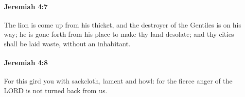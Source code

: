 		\paragraph{Jeremiah 4:7} %
			\label{JEREMIAH-4-7}

			The lion is come up from his thicket, and the destroyer of the Gentiles is on his way; he is gone forth from his place to make thy land desolate; and thy cities shall be laid waste, without an inhabitant.


		\paragraph{Jeremiah 4:8} %
			\label{JEREMIAH-4-8}

			For this gird you with sackcloth, lament and howl: for the fierce anger of the LORD is not turned back from us.


